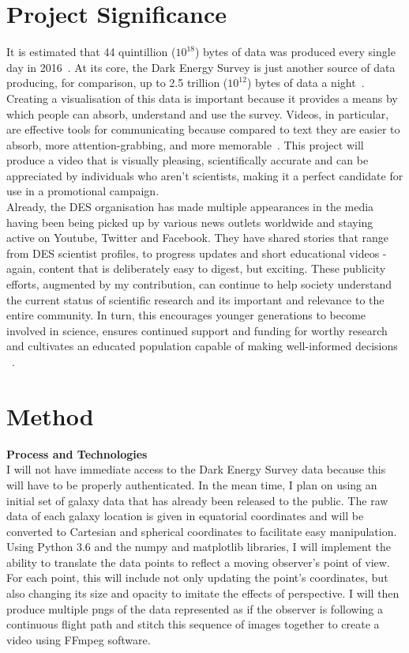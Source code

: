 \documentclass[pra, reprint, A4 paper, bibnotes]{revtex4-1}
\begin{document}
\section{Project Significance}
It is estimated that 44 quintillion ($10^{18}$) bytes of data was produced every single day in 2016~\cite{micro_focus_growth_2017}. At its core, the Dark Energy Survey is just another source of data producing, for comparison, up to 2.5 trillion ($10^{12}$) bytes of data a night~\cite{the_dark_energy_survey_survey_2018}. Creating a visualisation of this data is important because it provides a means by which people can absorb, understand and use the survey. Videos, in particular, are effective tools for communicating because compared to text they are easier to absorb, more attention-grabbing, and more memorable~\cite{chan_video_2010}. This project will produce a video that is visually pleasing, scientifically accurate and can be appreciated by individuals who aren't scientists, making it a perfect candidate for use in a promotional campaign.\\

Already, the DES organisation has made multiple appearances in the media having been being picked up by various news outlets worldwide and staying active on Youtube, Twitter and Facebook. They have shared stories that range from DES scientist profiles, to progress updates and short educational videos - again, content that is deliberately easy to digest, but exciting. These publicity efforts, augmented by my contribution, can continue to help society understand the current status of scientific research and its important and relevance to the entire community. In turn, this encourages younger generations to become involved in science, ensures continued support and funding for worthy research and cultivates an educated population capable of making well-informed decisions ~\cite{jucan_power_2014, julie_gould_importance_2014}. 
\section{Method}
\textbf{Process and Technologies}\\
I will not have immediate access to the Dark Energy Survey data because this will have to be properly authenticated. In the mean time, I plan on using an initial set of galaxy data that has already been released to the public. The raw data of each galaxy location is given in equatorial coordinates and will be converted to Cartesian and spherical coordinates to facilitate easy manipulation. Using Python 3.6 and the numpy and matplotlib libraries, I will implement the ability to translate the data points to reflect a moving observer's point of view. For each point, this will include not only updating the point's coordinates, but also changing its size and opacity to imitate the effects of perspective. I will then produce multiple pngs of the data represented as if the observer is following a continuous flight path and stitch this sequence of images together to create a video using FFmpeg software.\\
\end{document}

